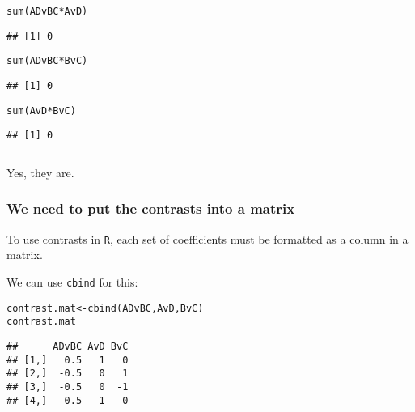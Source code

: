 \documentclass[color=usenames,dvipsnames]{beamer}\usepackage[]{graphicx}\usepackage[]{color}
\makeatletter
\newcommand{\hlopt}[1]{\textcolor[rgb]{0,0,0}{#1}}%
\newcommand{\hlstd}[1]{\textcolor[rgb]{0,0,0}{#1}}%
\newcommand{\hlkwb}[1]{\textcolor[rgb]{0,0.341,0.682}{#1}}%
\newcommand{\hlkwd}[1]{\textcolor[rgb]{0.004,0.004,0.506}{#1}}%
\newenvironment{kframe}{%
 \def\at@end@of@kframe{}%
 \ifinner\ifhmode%
  \def\at@end@of@kframe{\end{minipage}}%
  \begin{minipage}{\columnwidth}%
 \fi\fi%
 \def\FrameCommand##1{\hskip\@totalleftmargin \hskip-\fboxsep
 \colorbox{shadecolor}{##1}\hskip-\fboxsep
     \hskip-\linewidth \hskip-\@totalleftmargin \hskip\columnwidth}%
 \MakeFramed {\advance\hsize-\width
   \@totalleftmargin\z@ \linewidth\hsize
   \@setminipage}}%
 {\par\unskip\endMakeFramed%
 \at@end@of@kframe}
\newenvironment{knitrout}{}{} %
\makeatother
\begin{document}
\begin{frame}[fragile]
\begin{columns}
\begin{column}{0.5\textwidth}
\begin{knitrout}
\begin{kframe}
\begin{alltt}
\hlkwd{sum}\hlstd{(ADvBC} \hlopt{*} \hlstd{AvD)}
\end{alltt}
\begin{verbatim}
## [1] 0
\end{verbatim}
\begin{alltt}
\hlkwd{sum}\hlstd{(ADvBC} \hlopt{*} \hlstd{BvC)}
\end{alltt}
\begin{verbatim}
## [1] 0
\end{verbatim}
\begin{alltt}
\hlkwd{sum}\hlstd{(AvD} \hlopt{*} \hlstd{BvC)}
\end{alltt}
\begin{verbatim}
## [1] 0
\end{verbatim}
\end{kframe}
\end{knitrout}
  \end{column}
\end{columns}
\pause
\vfill
{%
  Yes, they are. \par}
\end{frame}









\begin{frame}[fragile]
  \frametitle{We need to put the contrasts into a matrix}
  {%
    To use contrasts in {\tt R}, each set of coefficients must be
    formatted as a column in a matrix. \par }  
  \pause
  \vfill
  {%
    We can use {\tt cbind} for this:}
\begin{knitrout}
\color{fgcolor}\begin{kframe}
\begin{alltt}
\hlstd{contrast.mat} \hlkwb{<-} \hlkwd{cbind}\hlstd{(ADvBC, AvD, BvC)}
\hlstd{contrast.mat}
\end{alltt}
\begin{verbatim}
##      ADvBC AvD BvC
## [1,]   0.5   1   0
## [2,]  -0.5   0   1
## [3,]  -0.5   0  -1
## [4,]   0.5  -1   0
\end{verbatim}
\end{kframe}
\end{knitrout}
\end{frame}
\end{document}
